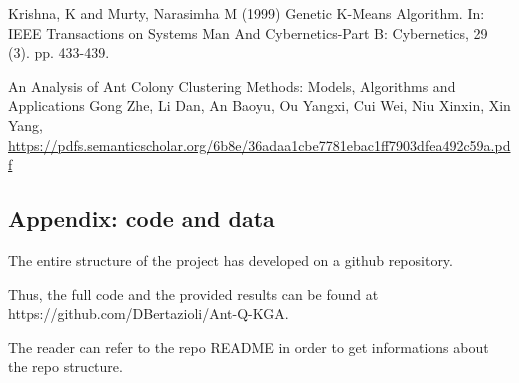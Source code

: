 \documentclass[10pt]{article}
\begin{document}
\begin{thebibliography}{9}
Krishna, K and Murty, Narasimha M (1999) Genetic K-Means Algorithm. In: IEEE Transactions on Systems Man And Cybernetics-Part B: Cybernetics, 29 (3). pp. 433-439.

An Analysis of Ant Colony Clustering Methods: Models, Algorithms and Applications Gong Zhe, Li Dan, An Baoyu, Ou Yangxi, Cui Wei, Niu Xinxin, Xin Yang, \url{https://pdfs.semanticscholar.org/6b8e/36adaa1cbe7781ebac1ff7903dfea492c59a.pdf}
\end{thebibliography}
\begin{appendix}
\appendix
\section{Appendix: code and data}
The entire structure of the project has developed on a github repository.

Thus, the full code and the provided results can be found at https://github.com/DBertazioli/Ant-Q-KGA.

The reader can refer to the repo README in order to get informations about the repo structure.
\end{appendix}
\end{document}
